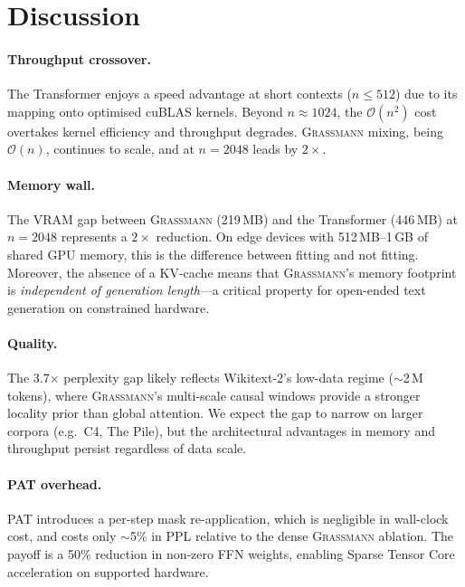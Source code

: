 \documentclass[conference]{IEEEtran}
\newcommand{\grassmann}{\textsc{Grassmann}}
\newcommand{\pat}{\textsc{PAT}}
\newcommand{\bigO}[1]{\ensuremath{\mathcal{O}(#1)}}
\begin{document}
\section{Discussion}
\label{sec:discussion}

\paragraph{Throughput crossover.}
The Transformer enjoys a speed advantage at short contexts
($n \leq 512$) due to its mapping onto optimised cuBLAS kernels.
Beyond $n \approx 1024$, the $\bigO{n^{2}}$ cost overtakes kernel
efficiency and throughput degrades. \grassmann{} mixing, being
\bigO{n}, continues to scale, and at $n = 2048$ leads by $2\times$.

\paragraph{Memory wall.}
The VRAM gap between \grassmann{} (219\,MB) and the Transformer
(446\,MB) at $n = 2048$ represents a $2\times$ reduction. On
edge devices with 512\,MB--1\,GB of shared GPU memory, this is the
difference between fitting and not fitting. Moreover, the absence of a
KV-cache means that \grassmann{}'s memory footprint is
\emph{independent of generation length}—a critical property for
open-ended text generation on constrained hardware.

\paragraph{Quality.}
The 3.7$\times$ perplexity gap likely reflects Wikitext-2's low-data
regime ($\sim$2\,M tokens), where \grassmann{}'s multi-scale causal
windows provide a stronger locality prior than global attention.
We expect the gap to narrow on larger corpora (e.g.\ C4, The Pile),
but the architectural advantages in memory and throughput persist
regardless of data scale.

\paragraph{\pat{} overhead.}
\pat{} introduces a per-step mask re-application, which is negligible
in wall-clock cost, and costs only $\sim$5\% in PPL relative to the
dense \grassmann{} ablation. The payoff is a 50\% reduction in
non-zero FFN weights, enabling Sparse Tensor Core acceleration on
supported hardware.
\end{document}
